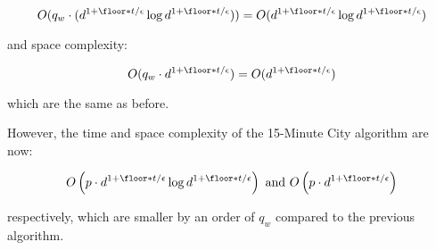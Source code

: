 $$O(q_w\cdot(d^{1+\floor*{t/\epsilon}}\log d^{1+\floor*{t/\epsilon}}))=O(d^{1+\floor*{t/\epsilon}}\log d^{1+\floor*{t/\epsilon}})$$

and space complexity:

$$O(q_w\cdot d^{1+\floor*{t/\epsilon}})=O(d^{1+\floor*{t/\epsilon}})$$

which are the same as before.

However, the time and space complexity of the 15-Minute City algorithm are now:

$$O\left(p\cdot d^{1+\floor*{t/\epsilon}}\log d^{1+\floor*{t/\epsilon}}\right)\text{ and }O\left(p\cdot d^{1+\floor*{t/\epsilon}}\right)$$

respectively, which are smaller by an order of $q_w$ compared to the previous algorithm.




